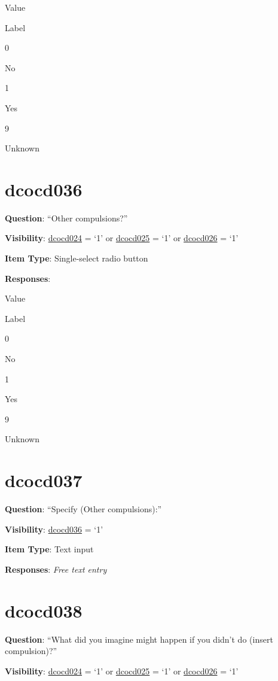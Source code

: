 \documentclass[]{book}
\begin{document}
Value

Label

0

No

1

Yes

9

Unknown

\hypertarget{dcocd036}{%
\section{dcocd036}\label{dcocd036}}

\textbf{Question}: ``Other compulsions?''

\textbf{Visibility}: \protect\hyperlink{dcocd024}{dcocd024} = `1' or \protect\hyperlink{dcocd025}{dcocd025} = `1' or \protect\hyperlink{dcocd026}{dcocd026} = `1'

\textbf{Item Type}: Single-select radio button

\textbf{Responses}:

Value

Label

0

No

1

Yes

9

Unknown

\hypertarget{dcocd037}{%
\section{dcocd037}\label{dcocd037}}

\textbf{Question}: ``Specify (Other compulsions):''

\textbf{Visibility}: \protect\hyperlink{dcocd036}{dcocd036} = `1'

\textbf{Item Type}: Text input

\textbf{Responses}: \emph{Free text entry}

\hypertarget{dcocd038}{%
\section{dcocd038}\label{dcocd038}}

\textbf{Question}: ``What did you imagine might happen if you didn't do (insert compulsion)?''

\textbf{Visibility}: \protect\hyperlink{dcocd024}{dcocd024} = `1' or \protect\hyperlink{dcocd025}{dcocd025} = `1' or \protect\hyperlink{dcocd026}{dcocd026} = `1'
\end{document}
